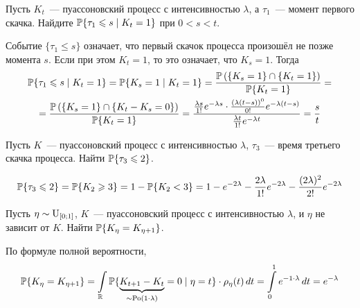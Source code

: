 \begin{Exercise}[counter=SecExercise, label={exercise:special:Poisson_process_first_event_conditional}]
    \noindent
    Пусть $ K_t $~--- пуассоновский процесс с интенсивностью $ \lambda $,
    а $ \tau_1 $~--- момент первого скачка.
    Найдите $ \mathbb{P}\{\tau_1 \leqslant s \mid K_t = 1\} $ при $ 0 < s < t $.
\end{Exercise}

\begin{Answer}
    \noindent
    Событие $ \{ \tau_1 \leqslant s \} $ означает, что первый скачок процесса произошёл не позже момента $ s $.
    Если при этом $ K_t = 1 $, то это означает, что $ K_s = 1 $.
    Тогда
    \begin{multline*}
        \mathbb{P} \{\tau_1 \leqslant s \mid K_t = 1 \} = \mathbb{P} \{K_s = 1 \mid K_t = 1\} = \frac{\mathbb{P}\left( \{K_s = 1\} \cap \{K_t = 1\} \right)}{\mathbb{P} \{K_t = 1 \}} = \\
        = \frac{\mathbb{P}\left( \{K_s = 1\} \cap \{K_t - K_s = 0\} \right)}{\mathbb{P}\{K_t = 1\}}
        = \frac{\frac{\lambda s}{1!} e^{-\lambda s} \cdot \frac{(\lambda(t - s))^0}{0!} e^{-\lambda(t - s)}}{\frac{\lambda t}{1!} e^{-\lambda t}} = \frac{s}{t}
    \end{multline*}
\end{Answer}


\begin{Exercise}[counter=SecExercise, label={exercise:special:Poisson_process_third_event}]
    \noindent
    Пусть $ K $~--- пуассоновский процесс с интенсивностью $ \lambda $, $ \tau_3 $~--- время третьего скачка процесса.
    Найти $ \mathbb{P} \{\tau_3 \leqslant 2 \} $.
\end{Exercise}

\begin{Answer}
    \noindent
    \[
        \mathbb{P} \{ \tau_3 \leqslant 2 \} = \mathbb{P} \{ K_2 \geqslant 3 \} = 1 - \mathbb{P} \{ K_2 < 3 \} = 1 - e^{-2 \lambda} - \frac{2 \lambda}{1!} e^{-2 \lambda} - \frac{(2 \lambda)^2}{2!} e^{-2 \lambda}
    \]
\end{Answer}


\begin{Exercise}[counter=SecExercise, label={exercise:special:Poisson_process_no_event}]
    \noindent
    Пусть $ \eta \sim \textnormal{U}_{[0; 1]} $,
    $ K $~--- пуассоновский процесс с интенсивностью $ \lambda $, и $ \eta $ не зависит от $ K $.
    Найти $ \mathbb{P}\{K_\eta = K_{\eta + 1}\} $.
\end{Exercise}

\begin{Answer}
    \noindent
    По формуле полной вероятности,
    \[
        \mathbb{P} \{K_\eta = K_{\eta + 1}\} = \int\limits_{\mathbb{R}} \mathbb{P}\{\underbrace{K_{t + 1} - K_t}_{\sim \textnormal{Po}(1 \cdot \lambda)} = 0 \mid \eta = t\} \cdot \rho_\eta(t) \, dt =
        \int\limits_0^1 e^{-1 \cdot \lambda} \, dt = e^{-\lambda}
    \]
\end{Answer}

